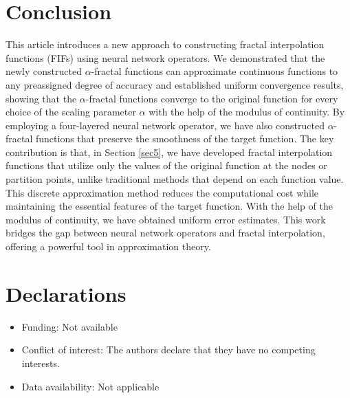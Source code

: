 \documentclass{article}[12pt, a4]
\begin{document}
	\section{Conclusion}\label{sec13}
	
	This article introduces a new approach to constructing fractal interpolation functions (FIFs) using neural network operators. We demonstrated that the newly constructed $\alpha$-fractal functions can approximate continuous functions to any preassigned degree of accuracy and established uniform convergence results, showing that the $\alpha$-fractal functions converge to the original function for every choice of the scaling parameter $\alpha$ with the help of the modulus of continuity.   By employing a four-layered neural network operator, we have also constructed $\alpha$-fractal functions that preserve the smoothness of the target function. The key contribution is that, in Section \ref{sec5}, we have developed fractal interpolation functions that utilize only the values of the original function at the nodes or partition points, unlike traditional methods that depend on each function value. This discrete approximation method reduces the computational cost while maintaining the essential features of the target function. With the help of the modulus of continuity, we have obtained uniform error estimates. This work bridges the gap between neural network operators and fractal interpolation, offering a powerful tool in approximation theory.
	
	\section*{Declarations}
	
	
	\begin{itemize}
		\item Funding: Not available
		\item Conflict of interest: The authors declare that they have no competing interests.
		\item Data availability:
		Not applicable 
		
	\end{itemize}
	
	
		
		
		
		
		
\end{document}
